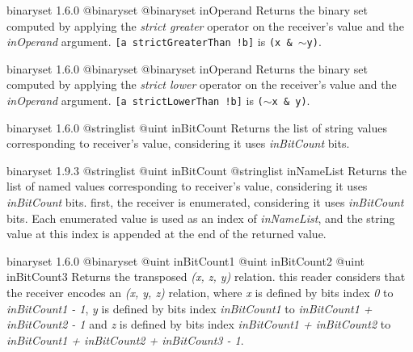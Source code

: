 {binaryset}
{1.6.0}
{@binaryset}
{@binaryset inOperand}
{Returns the binary set computed by applying the \emph{strict greater} operator on the receiver's value and the \emph{inOperand} argument.}
{\texttt{[a strictGreaterThan !b]} is \texttt{(x \& $\sim$y)}.}







{binaryset}
{1.6.0}
{@binaryset}
{@binaryset inOperand}
{Returns the binary set computed by applying the \emph{strict lower} operator on the receiver's value and the \emph{inOperand} argument.}
{\texttt{[a strictLowerThan !b]} is \texttt{($\sim$x \& y)}.}







{binaryset}
{1.6.0}
{@stringlist}
{@uint inBitCount}
{Returns the list of string values corresponding to receiver's value, considering it uses \emph{inBitCount} bits.}
{}







{binaryset}
{1.9.3}
{@stringlist}
{@uint inBitCount}
{@stringlist inNameList}
{Returns the list of named values corresponding to receiver's value, considering it uses \emph{inBitCount} bits.}
{first, the receiver is enumerated, considering it uses \emph{inBitCount} bits. Each enumerated value is used as an index of \emph{inNameList}, and the string value at this index is appended at the end of the returned value.}







{binaryset}
{1.6.0}
{@binaryset}
{@uint inBitCount1}
{@uint inBitCount2}
{@uint inBitCount3}
{Returns the transposed \emph{(x, z, y)} relation.}
{this reader considers that the receiver encodes an \emph{(x, y, z)} relation, where \emph{x} is defined by bits index \emph{0} to \emph{inBitCount1  - 1}, \emph{y} is defined by bits index \emph{inBitCount1} to \emph{inBitCount1 + inBitCount2 - 1} and  \emph{z} is defined by bits index \emph{inBitCount1 + inBitCount2} to \emph{inBitCount1 + inBitCount2 + inBitCount3 - 1}.}








